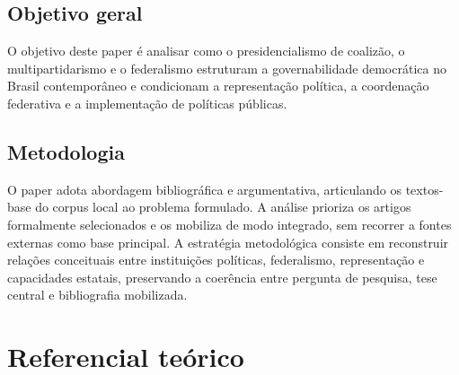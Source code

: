 \documentclass[12pt,a4paper]{article}
\begin{document}
\subsection{Objetivo geral}
\label{sec:org96bd27e}
O objetivo deste paper é analisar como o presidencialismo de coalizão, o multipartidarismo e o federalismo estruturam a governabilidade democrática no Brasil contemporâneo e condicionam a representação política, a coordenação federativa e a implementação de políticas públicas.
\subsection{Metodologia}
\label{sec:orge59791d}
O paper adota abordagem bibliográfica e argumentativa, articulando os textos-base do corpus local ao problema formulado. A análise prioriza os artigos formalmente selecionados e os mobiliza de modo integrado, sem recorrer a fontes externas como base principal. A estratégia metodológica consiste em reconstruir relações conceituais entre instituições políticas, federalismo, representação e capacidades estatais, preservando a coerência entre pergunta de pesquisa, tese central e bibliografia mobilizada.
\section{Referencial teórico}
\label{sec:org4957e9c}
\end{document}
